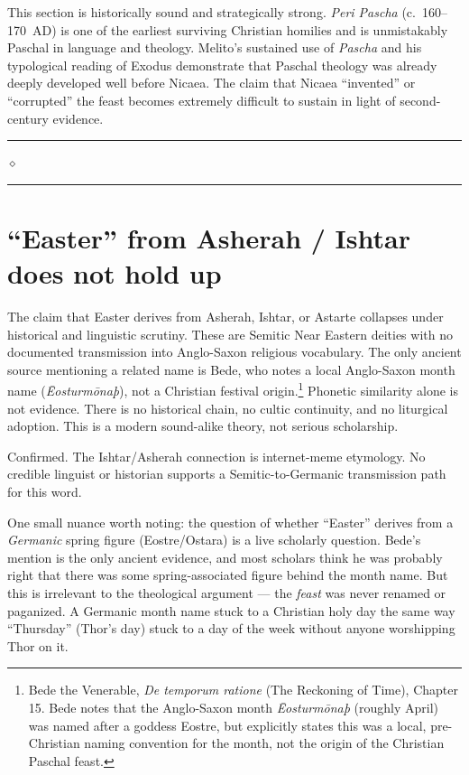 \documentclass[10pt,twoside,openany]{book}
\newcommand{\ornrule}{%
  \par\bigskip
  {\noindent\hfil{\color{gold}\rule[0.5ex]{1.5in}{0.5pt}%
  \quad$\diamond$\quad%
  \rule[0.5ex]{1.5in}{0.5pt}}\hfil\par}%
  \bigskip
}
\begin{document}
\begin{gptbox}
This section is historically sound and strategically strong.
\emph{Peri Pascha} (c.\ 160--170~AD) is one of the earliest surviving
Christian homilies and is unmistakably Paschal in language and
theology. Melito's sustained use of \emph{Pascha} and his typological
reading of Exodus demonstrate that Paschal theology was already deeply
developed well before Nicaea. The claim that Nicaea ``invented'' or
``corrupted'' the feast becomes extremely difficult to sustain in
light of second-century evidence.
\end{gptbox}

\ornrule



\section{``Easter'' from Asherah / Ishtar does not hold up}

The claim that Easter derives from Asherah, Ishtar, or Astarte
collapses under historical and linguistic scrutiny. These are Semitic
Near Eastern deities with no documented transmission into Anglo-Saxon
religious vocabulary. The only ancient source mentioning a related name
is Bede, who notes a local Anglo-Saxon month name (\emph{Ēosturmōnaþ}), not
a Christian festival origin.\footnote{Bede the Venerable, \emph{De temporum ratione} (The Reckoning of Time), Chapter 15. Bede notes that the Anglo-Saxon month \emph{Ēosturmōnaþ} (roughly April) was named after a goddess Eostre, but explicitly states this was a local, pre-Christian naming convention for the month, not the origin of the Christian Paschal feast.} Phonetic similarity alone is not evidence.
There is no historical chain, no cultic continuity, and no liturgical
adoption. This is a modern sound-alike theory, not serious scholarship.

\begin{reviewerbox}
Confirmed. The Ishtar/Asherah connection is internet-meme etymology. No credible linguist or historian
supports a Semitic-to-Germanic transmission path for
this word.

One small nuance worth noting: the question of whether
``Easter'' derives from a \emph{Germanic} spring figure
(Eostre/Ostara) is a live scholarly question. Bede's
mention is the only ancient evidence, and most scholars
think he was probably right that there was some spring-associated figure behind the month name. But this is
irrelevant to the theological argument --- the \emph{feast}
was never renamed or paganized. A Germanic month name
stuck to a Christian holy day the same way ``Thursday''
(Thor's day) stuck to a day of the week without anyone
worshipping Thor on it.
\end{reviewerbox}
\end{document}
